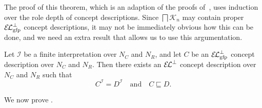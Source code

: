 The proof of this theorem, which is an adaption of the proofs of~\cite[Lemma~6.8,
Theorem~6.9]{Diss-Felix}, uses induction over the role depth of concept descriptions.
Since $\bigsqcap \mathcal{K}_{n}$ may contain proper $\ELgfpbot$ concept descriptions, it
may not be immediately obvious how this can be done, and we need an extra result that
allows us to use this argumentation.

\begin{Lemma}
  \label{lem:Felix-5.6}
  Let $\mathcal{I}$ be a finite interpretation over $N_{C}$ and $N_{R}$, and let $C$ be an
  $\ELgfpbot$ concept description over $N_{C}$ and $N_{R}$.  Then there exists an ${{\mathcal{E}\kern-.3ex\mathcal{L}}^\bot}$
  concept description over $N_{C}$ and $N_{R}$ such that
  \begin{equation*}
    C^{\mathcal{I}} = D^{\mathcal{I}} \quad\text{and}\quad C \sqsubseteq D.
  \end{equation*}
\end{Lemma}

We now prove .

